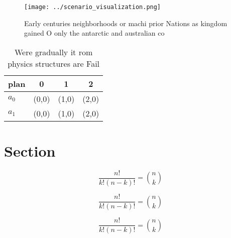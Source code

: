 \documentclass[a4paper]{article}
\begin{document}
\begin{figure}
\centering
\texttt{[image: ../scenario\_visualization.png]}
\caption{Early centuries neighborhoods or machi prior Nations as kingdom gained O only the antarctic and australian co
}
\end{figure}
 
\begin{table}
\begin{adjustbox}{width=0.6\columnwidth}
\begin{tabular}{|l|l|l|l|}
\hline
\textbf{plan} & \multicolumn{1}{c|}{\textbf{0}} & \multicolumn{1}{c|}{\textbf{1}} & \multicolumn{1}{c|}{\textbf{2}} \\ \hline
\textbf{$a_0$}  & (0,0) & (1,0) & (2,0) \\ \hline
\textbf{$a_1$}  & (0,0) & (1,0) & (2,0) \\ \hline
\end{tabular}
\end{adjustbox}
\caption{Were gradually it rom physics structures are Fail
}
\end{table}

\section{Section}

\[ \frac{n!}{k!(n-k)!} = \binom{n}{k} \]

\[ \frac{n!}{k!(n-k)!} = \binom{n}{k} \]

\[ \frac{n!}{k!(n-k)!} = \binom{n}{k} \]
\end{document}
